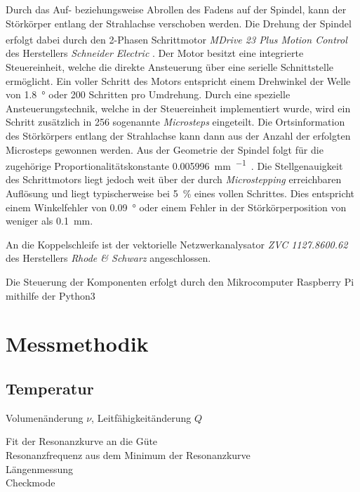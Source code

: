 Durch das Auf- beziehungsweise Abrollen des Fadens auf der Spindel, kann der Störkörper entlang der Strahlachse verschoben werden.
Die Drehung der Spindel erfolgt dabei durch den 2-Phasen Schrittmotor \textit{MDrive\textsuperscript{\textregistered} 23 Plus Motion Control} des Herstellers \textit{Schneider Electric} \cite{motor_datasheet}.
Der Motor besitzt eine integrierte Steuereinheit, welche die direkte Ansteuerung über eine serielle Schnittstelle ermöglicht.
Ein voller Schritt des Motors entspricht einem Drehwinkel der Welle von \SI{1.8}{\degree} oder \num{200} Schritten pro Umdrehung.
Durch eine spezielle Ansteuerungstechnik, welche in der Steuereinheit implementiert wurde, wird ein Schritt zusätzlich in \num{256} sogenannte \textit{Microsteps} eingeteilt.
Die Ortsinformation des Störkörpers entlang der Strahlachse kann dann aus der Anzahl der erfolgten Microsteps gewonnen werden.
Aus der Geometrie der Spindel folgt für die zugehörige Proportionalitätskonstante \SI{0.005996}{\milli\metre\per\micro\step}.
Die Stellgenauigkeit  des Schrittmotors liegt jedoch weit über der durch \textit{Microstepping} erreichbaren Auflösung und liegt typischerweise bei \SI{5}{\percent} eines vollen Schrittes.
Dies entspricht einem Winkelfehler von \SI{0.09}{\degree} oder einem Fehler in der Störkörperposition von weniger als \SI{0.1}{\milli\metre}.



An die Koppelschleife ist der vektorielle Netzwerkanalysator \textit{ZVC 1127.8600.62} des Herstellers \textit{Rhode \& Schwarz} angeschlossen.

Die Steuerung der Komponenten erfolgt durch den Mikrocomputer Raspberry Pi mithilfe der Python3







\section{Messmethodik}

\subsection{Temperatur}
Volumenänderung $\nu$, Leitfähigkeitänderung $Q$

Fit der Resonanzkurve an die Güte\\
Resonanzfrequenz aus dem Minimum der Resonanzkurve\\
Längenmessung\\
Checkmode

